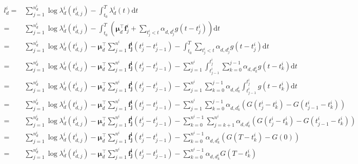 \documentclass{article}
\begin{document}
			\begin{equation}
				\begin{aligned} 
					l^i_d 
					=& \sum_{j=1}^{n^i_d} \log \lambda^i_d\left(t^i_{d, j}\right)-\int_{t_0}^{T} \lambda^i_d(t) \mathrm{d}t \\
					=& \sum_{j=1}^{n^i_d} \log \lambda^i_d\left(t^i_{d, j}\right)-\int_{t_0}^{T}
					\left(
					 \boldsymbol{\mu}_{d}^{\top} \boldsymbol{f}_{j}^{i}+\sum_{t_{j}^{i}<t} \alpha_{d, d_{j}^{i}} g\left(t-t_{j}^{i}\right) \right) \mathrm{d}t \\
					 =& \sum_{j=1}^{n^i_d} \log \lambda^i_d\left(t^i_{d, j}\right)
					 - \boldsymbol{\mu}_d^{\top} \sum_{j=1}^{n^i} \boldsymbol{f^i_j }\left(t^i_j - t^i_{j-1}\right) 
					 - \int_{t_{0}}^{T}\sum_{t_{j}^{i}<t} \alpha_{d, d_{j}^{i}} g\left(t-t_{j}^{i}\right) \mathrm{d} t \\
					 =& \sum_{j=1}^{n^i_d} \log \lambda^i_d\left(t^i_{d, j}\right)
					 - \boldsymbol{\mu}_d^{\top} \sum_{j=1}^{n^i} \boldsymbol{f^i_j }\left(t^i_j - t^i_{j-1}\right) 
					 - \sum_{j=1}^{n^i} \int_{t^i_{j-1}}^{t^i_j}\sum_{k=0}^{j-1}\alpha_{d, d^i_k} g\left(t-t^i_k\right) \mathrm{d} t \\
					 =& \sum_{j=1}^{n^i_d} \log \lambda^i_d\left(t^i_{d, j}\right)
					 - \boldsymbol{\mu}_d^{\top} \sum_{j=1}^{n^i} \boldsymbol{f^i_j }\left(t^i_j - t^i_{j-1}\right) 
					 - \sum_{j=1}^{n^i} \sum_{k=0}^{j-1} \alpha_{d, d^i_k} \int_{t^i_{j-1}}^{t^i_j} g\left(t-t^i_k\right) \mathrm{d} t\\
					 =& \sum_{j=1}^{n^i_d} \log \lambda^i_d\left(t^i_{d, j}\right)
					 - \boldsymbol{\mu}_d^{\top} \sum_{j=1}^{n^i} \boldsymbol{f^i_j }\left(t^i_j - t^i_{j-1}\right) 
					 - \sum_{j=1}^{n^i} \sum_{k=0}^{j-1} \alpha_{d, d^i_k} \left(G\left(t^i_j - t^i_k\right) - G\left(t^i_{j-1} - t^i_k\right)\right)\\
					  =& \sum_{j=1}^{n^i_d} \log \lambda^i_d\left(t^i_{d, j}\right)
					 - \boldsymbol{\mu}_d^{\top} \sum_{j=1}^{n^i} \boldsymbol{f^i_j }\left(t^i_j - t^i_{j-1}\right) 
					 - \sum_{k=0}^{n^i-1}\sum_{j=k+1}^{n^i}  \alpha_{d, d^i_k} \left(G\left(t^i_j - t^i_k\right) - G\left(t^i_{j-1} - t^i_k\right)\right)\\
					  =& \sum_{j=1}^{n^i_d} \log \lambda^i_d\left(t^i_{d, j}\right)
					 - \boldsymbol{\mu}_d^{\top} \sum_{j=1}^{n^i} \boldsymbol{f^i_j }\left(t^i_j - t^i_{j-1}\right) 
					 - \sum_{k=0}^{n^i-1}  \alpha_{d, d^i_k} \left(G\left(T - t^i_k\right) - G\left(0\right)\right)\\
					  =& \sum_{j=1}^{n^i_d} \log \lambda^i_d\left(t^i_{d, j}\right)
					 - \boldsymbol{\mu}_d^{\top} \sum_{j=1}^{n^i} \boldsymbol{f^i_j }\left(t^i_j - t^i_{j-1}\right) 
					 - \sum_{k=0}^{n^i-1}  \alpha_{d, d^i_k} G\left(T - t^i_k\right)\\
				\end{aligned}
			\end{equation}
\end{document}
